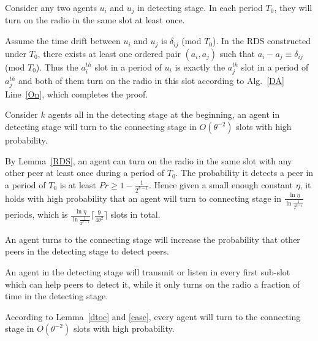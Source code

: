 \begin{lemma}
    \label{RDS}
    Consider any two agents $u_i$ and $u_j$ in detecting stage.
    In each period $T_0$, they will turn on the radio in the same slot at least once.
\end{lemma}
\begin{IEEEproof}
Assume the time drift between $u_i$ and $u_j$ is $\delta_{ij}$ (mod $T_0$).
In the RDS constructed under $T_0$, there exists at least one ordered pair $(a_i,a_j)$ such that $a_i - a_j \equiv \delta_{ij}$ (mod $T_0$).
Thus the $a_i^{th}$ slot in a period of $u_i$ is exactly the $a_j^{th}$ slot in a period of $a_j^{th}$ and both of them
turn on the radio in this slot according to Alg.~\ref{DA} Line~\ref{On}, which completes the proof.
\end{IEEEproof}

\begin{lemma}
    \label{dtoc}
    Consider $k$ agents all in the detecting stage at the beginning, 
    an agent in detecting stage will turn to the connecting stage in 
    $O(\theta^{-2})$ slots with high probability.
\end{lemma}
\begin{IEEEproof}
    By Lemma~\ref{RDS}, an agent can turn on the radio in the same 
    slot with any other peer at least once during a period of $T_0$.
    The probability it detects a peer in a period of $T_0$ is at least
    $Pr \geq 1 - \frac{1}{2^{k-1}}$.
    Hence given a small enough constant $\eta$,  
    it holds with high probability that an agent will turn to connecting stage in 
    $\frac{\ln\eta}{\ln\frac{1}{2^{k-1}}}$ periods, which is 
    $\frac{\ln\eta}{\ln\frac{1}{2^{k-1}}} \lceil \frac{9}{4\theta^{2}} \rceil$ slots
    in total.    
\end{IEEEproof}
\vspace{0.1in}
\begin{lemma}
    \label{case}
    An agent turns to the connecting stage will increase the probability that other
    peers in the detecting stage to detect peers.
\end{lemma}
\begin{IEEEproof}
    An agent in the detecting stage will transmit or listen in every first sub-slot 
    which can help peers to detect it,
    while it only turns on the radio a fraction of time in the detecting stage.
\end{IEEEproof}
   
According to Lemma~\ref{dtoc} and \ref{case}, every agent will turn to the connecting stage in 
$O(\theta^{-2})$ slots with high probability. 

